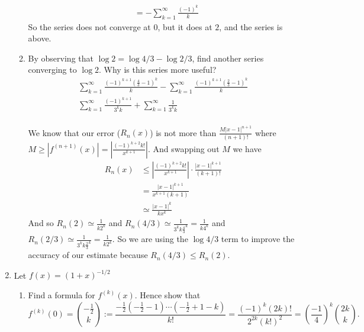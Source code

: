 \documentclass[letterpaper]{article}
\begin{document}
\begin{enumerate}
\begin{enumerate}
\begin{align*}
    &=-\sum\limits_{k=1}^\infty{\frac{(-1)^k}{k}}
  \end{align*}
  So the series does not converge at $0$, but it does at $2$, and the series is above.
  \item
  By observing that $\log 2=\log 4/3-\log 2/3$, find another series converging to $\log 2$. Why is this series more useful?
  \begin{align*}
    \sum\limits_{k=1}^\infty{\frac{(-1)^{k+1}(\frac{4}{3}-1)^k}{k}}
    -\sum\limits_{k=1}^\infty{\frac{(-1)^{k+1}(\frac{2}{3}-1)^k}{k}}\\
    \sum\limits_{k=1}^\infty{\frac{(-1)^{k+1}}{3^kk}}
    +\sum\limits_{k=1}^\infty{\frac{1}{3^kk}}\\
  \end{align*}

  We know that our error ($R_n(x)$) is not more than
  $\frac{M|x-1|^{n+1}}{(n+1)!}$
  where $M\ge |f^{(n+1)}(x)|=\left\lvert\frac{(-1)^{k+2}k!}{x^{k+1}}\right\rvert$. And swapping out $M$ we have
  \begin{align*}
    R_n(x)
    &\le \left\lvert\frac{(-1)^{k+2}k!}{x^{k+1}}\right\rvert\cdot\frac{|x-1|^{k+1}}{(k+1)!}\\
    &= \frac{|x-1|^{k+1}}{x^{k+1}(k+1)}\\
    &\simeq \frac{|x-1|^{k}}{kx^{k}}
  \end{align*}
  And so $R_n(2)\simeq\frac{1}{k2^k}$ and $R_n(4/3)\simeq\frac{1}{3^kk\frac{4}{3}^k}=\frac{1}{k4^k}$ and $R_n(2/3)\simeq\frac{1}{3^kk\frac{2}{3}^k}=\frac{1}{k2^k}$. So we are using the $\log 4/3$ term to improve the accuracy of our estimate because $R_n(4/3)\le R_n(2)$.
  \end{enumerate}
\setcounter{enumi}{8}
\item
Let $f(x)=(1+x)^{-1/2}$
  \begin{enumerate}
  \item
  Find a formula for $f^{(k)}(x)$. Hence show that
  \[f^{(k)}(0)={-\frac{1}{2} \choose k}:=\frac{-\frac{1}{2}(-\frac{1}{2}-1)\cdots(-\frac{1}{2}+1-k)}{k!}=\frac{(-1)^k(2k)!}{2^{2k}(k!)^2}=\left(\frac{-1}{4}\right)^k{2k\choose k}.\]


\end{enumerate}
\end{enumerate}
\end{document}
